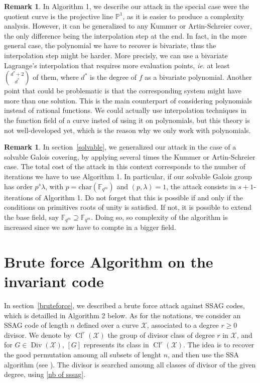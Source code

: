 \documentclass[10pt]{article}
\theoremstyle{definition}
\newtheorem{rq1}[thm]{Remark}
\theoremstyle{definition}
\theoremstyle{definition}
\newcommand{\PP}{\mathbb{P}}
\newcommand{\Fqm}{\mathbb{F}_{q^m}}
\newcommand{\X}{\mathcal{X}}
\newcommand{\Div}{\operatorname{Div}}
\newcommand{\Cl}{\operatorname{Cl}}
\begin{document}
\begin{rq1}
In Algorithm 1, we describe our attack in the special case were the quotient curve is the projective line $\PP^1$, as it is easier to produce a complexity analysis. However, it can be generalized to any Kummer or Artin-Schreier cover, the only difference being the interpolation step at the end. In fact, in the more general case, the polynomial we have to recover is bivariate, thus the interpolation step might be harder. More precisly, we can use a bivariate Lagrange's interpolation that requires more evaluation points, \textit{ie.} at least $\binom{d^*+2}{d^*}$ of them, where $d^*$ is the degree of $f$ as a bivariate polynomial. Another point that could be problematic is that the corresponding system might have more than one solution.
This is the main counterpart of considering polynomials instead of rational functions. We could actually use interpolation techniques in the function field of a curve insted of using it on polynomials, but this theory is not well-developed yet, which is the reason why we only work with polynomials.
\end{rq1}

\begin{rq1}
In section~\ref{solvable}, we generalized our attack in the case of a solvable Galois covering, by applying several times the Kummer or Artin-Schreier case. The total cost of the attack in this context corresponds to the number of iterations we have to use Algorithm 1. In particular, if our solvable Galois group has order $p^s\lambda$, with $p=\mathrm{char}(\Fqm)$ and $(p,\lambda)=1$, the attack consists in $s+1$-iterations of Algorithm 1. Do not forget that this is possible if and only if the conditions on primitives roots of unity is satisfied. If not, it is possible to extend the base field, say $\mathbb{F}_{q^m} \supseteq \Fqm$. Doing so, so complexity of the algorithm is increased since we now have to compte in a bigger field.
\end{rq1}

\newpage

\section{Brute force Algorithm on the invariant code}


In section~\ref{bruteforce}, we described a brute force attack against SSAG codes, which is detailled in Algorithm 2 below. As for the notations, we consider an SSAG code of length $n$ defined over a curve $\X$, associated to a degree $r \geq 0$ divisor. We denote by $\Cl^r(\X)$ the group of divisor class of degree $r$ in $\X$, and for $G \in \Div(\X)$, $[G]$ represents its class in $\Cl^r(\X)$. The idea is to recover the good permutation amoung all subsets of lenght $n$, and then use the SSA algorithm (see \cite{SSA}). The divisor is searched amoung all classes of divisor of the given degree, using \eqref{nb of sssag}.
\end{document}

